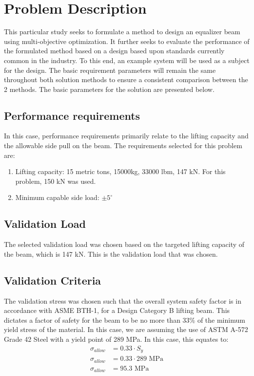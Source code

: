 \section{Problem Description}
This particular study seeks to formulate a method to design an equalizer beam using multi-objective optimization. It further seeks to evaluate the performance of the formulated method based on a design based upon standards currently common in the industry.
To this end, an example system will be used as a subject for the design. The basic requirement parameters will remain the same throughout both solution methods to ensure a consistent comparison between the 2 methods. The basic parameters for the solution are presented below. 

\subsection{Performance requirements}
In this case, performance requirements primarily relate to the lifting capacity and the allowable side pull on the beam. The requirements selected for this problem are: 
\begin{enumerate}
\item Lifting capacity: 15 metric tons, 15000kg, 33000 lbm, 147 kN. For this problem, 150 kN was used. 
\item Minimum capable side load: $\pm 5^{\circ} $
\end{enumerate}
\subsection{Validation Load}
The selected validation load was chosen based on the targeted lifting capacity of the beam, which is 147 kN. This is the validation load that was chosen. 
\subsection{Validation Criteria}
The validation stress was chosen such that the overall system safety factor is in accordance with ASME BTH-1, for a Design Category B lifting beam. This dictates a factor of safety for the beam to be no more than 33\% of the minimum yield stress of the material. In this case, we are assuming the use of ASTM A-572 Grade 42 Steel with a yield point of 289 MPa. 
In this case, this equates to:
\begin{align*}
	\sigma_{\mathit{allow}} &= 0.33 \cdot S_{y}\\
	\sigma_{allow} &= 0.33 \cdot 289  \text{ MPa} \\
	\sigma_{allow} &= 95.3 \text{ MPa}
\end{align*}
